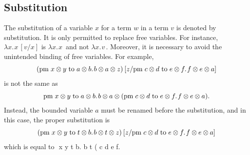 \subsection{Substitution}
The substitution of a variable $x$ for a term $w$ in a term $v$ is denoted by \gls{substitution}. It is only  permitted  to replace free variables. For instance, $\lambda x. \hspace{1pt} x  \hspace{2pt} [v/x]$ is $\lambda x. \hspace{1pt} x  \hspace{2pt}$ and not  $\lambda x. \hspace{1pt} v  \hspace{2pt}$. Moreover, it is necessary to avoid the unintended binding of free variables. For example, $$(\text{pm} \hspace{3 pt} x \otimes y\hspace{3 pt} \text{to} \hspace{3 pt} a \otimes b. \hspace{1pt} b \otimes a \otimes z) \hspace{2 pt}  [z/\text{pm} \hspace{3 pt} c \otimes d\hspace{3 pt} \text{to} \hspace{3 pt} e \otimes f. \hspace{1pt} f \otimes e \otimes a]$$ is not the same as $$\text{pm} \hspace{3 pt} x \otimes y\hspace{3 pt} \text{to} \hspace{3 pt} a \otimes b. \hspace{1pt} b \otimes a \otimes (\text{pm} \hspace{3 pt} c \otimes d\hspace{3 pt} \text{to} \hspace{3 pt} e \otimes f. \hspace{1pt} f \otimes e \otimes a ). $$ Instead, the bounded variable $a$ must be renamed before the substitution, and in this case, the proper substitution is $$(\text{pm} \hspace{3 pt} x \otimes y\hspace{3 pt} \text{to} \hspace{3 pt} t \otimes b. \hspace{1pt} b \otimes t \otimes z) \hspace{2 pt}  [z/\text{pm} \hspace{3 pt} c \otimes d\hspace{3 pt} \text{to} \hspace{3 pt} e \otimes f. \hspace{1pt} f \otimes e \otimes a]$$ which is equal to $$ \hspace{3 pt} x \otimes y\hspace{3 pt}  \hspace{3 pt} t \otimes b. \hspace{1pt} b \otimes t \otimes ( \hspace{3 pt} c \otimes d\hspace{3 pt}  \hspace{3 pt} e \otimes f. 